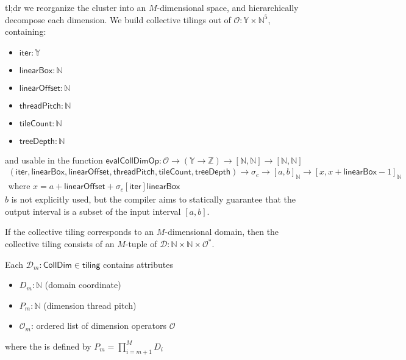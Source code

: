 tl;dr we reorganize the cluster into an $M$-dimensional space, and hierarchically decompose each dimension.
\filbreak
We build collective tilings out of  $\mathcal{O}: \mathbb{Y} \times \mathbb{N}^5$, containing:
\begin{itemize}
  \item $\mathsf{iter}: \mathbb{Y}$
  \filbreak
  \item $\mathsf{linearBox}: \mathbb{N}$
  \filbreak
  \item $\mathsf{linearOffset}: \mathbb{N}$
  \filbreak
  \item $\mathsf{threadPitch}: \mathbb{N}$
  \filbreak
  \item $\mathsf{tileCount}: \mathbb{N}$
  \filbreak
  \item $\mathsf{treeDepth}: \mathbb{N}$
\end{itemize}
\filbreak
and usable in the function $\mathsf{evalCollDimOp}: \mathcal{O} \to (\mathbb{Y} \to \mathbb{Z}) \to [\mathbb{N}, \mathbb{N}] \to [\mathbb{N}, \mathbb{N}]$
\begin{gather*}
    (\mathsf{iter}, \mathsf{linearBox}, \mathsf{linearOffset}, \mathsf{threadPitch}, \mathsf{tileCount}, \mathsf{treeDepth}) \to
    \sigma_c \to
    [a, b]_\mathbb{N} \to
    [x, x + \mathsf{linearBox} - 1]_\mathbb{N} \\
    \text{where } x = a + \mathsf{linearOffset} + \sigma_c[\mathsf{iter}] \mathsf{linearBox}
\end{gather*}
$b$ is not explicitly used, but the compiler aims to statically guarantee that the output interval is a subset of the input interval $[a, b]$.

\filbreak
If the collective tiling corresponds to an $M$-dimensional domain, then the collective tiling consists of an $M$-tuple of  $\mathcal{D}: \mathbb{N} \times \mathbb{N} \times \mathcal{O}^*$.

\filbreak
Each $\mathcal{D}_m : \mathsf{CollDim} \in \mathsf{tiling}$ contains attributes
\begin{itemize}
  \item $D_m: \mathbb{N}$ (domain coordinate)
  \filbreak
  \item $P_m: \mathbb{N}$ (dimension thread pitch)
  \filbreak
  \item $\mathcal{O}_m$: ordered list of dimension operators $\mathcal{O}$
\end{itemize}
where the  is defined by $P_m = \prod_{i = m+1}^M D_i$

